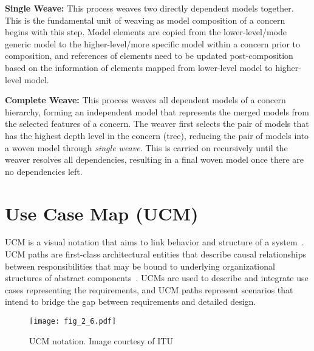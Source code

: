 \textbf{Single Weave:} This process weaves two directly dependent models together. This is the fundamental unit of weaving as model composition of a concern begins with this step. Model elements are copied from the lower-level/mode generic model to the higher-level/more specific model within a concern prior to composition, and references of elements need to be updated post-composition based on the information of elements mapped from lower-level model to higher-level model.

\textbf{Complete Weave:} This process weaves all dependent models of a concern hierarchy, forming an independent model that represents the merged models from the selected features of a concern. The weaver first selects the pair of models that has the highest depth level in the concern (tree), reducing the pair of models into a woven model through \emph{single weave}. This is carried on recursively until the weaver resolves all dependencies, resulting in a final woven model once there are no dependencies left.

\section{Use Case Map (UCM)} \label{sec:2.2}

UCM is a visual notation that aims to link behavior and structure of a system~\cite{amyot2003introduction, buhr1995use}. UCM paths are first-class architectural entities that describe causal relationships between responsibilities that may be bound to underlying organizational structures of abstract components~\cite{buhr1998use}. UCMs are used to describe and integrate use cases representing the requirements, and UCM paths represent scenarios that intend to bridge the gap between requirements and detailed design.

\begin{figure}
	\centering
	\texttt{[image: fig\_2\_6.pdf]}
	\caption[UCM notation]{UCM notation. Image courtesy of ITU~\cite{itu2012151}}
	\label{fig:2.6}
\end{figure}

